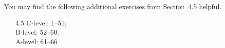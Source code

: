 \documentclass{article}
\begin{document}
\noindent
You may find the following additional exercises from Section~4.5
helpful.
\begin{itemize}
\item[4.5]
  C-level: 1--51; \\
  B-level: 52--60; \\
  A-level: 61--66
\end{itemize}
\end{document}
